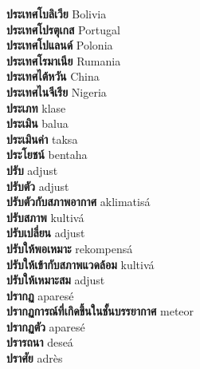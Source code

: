 \textbf{ ประเทศโบลิเวีย  } Bolivia \\
\textbf{ ประเทศโปรตุเกส  } Portugal \\
\textbf{ ประเทศโปแลนด์  } Polonia \\
\textbf{ ประเทศโรมาเนีย  } Rumania \\
\textbf{ ประเทศไต้หวัน  } China \\
\textbf{ ประเทศไนจีเรีย  } Nigeria \\
\textbf{ ประเภท  } klase \\
\textbf{ ประเมิน  } balua \\
\textbf{ ประเมินค่า  } taksa \\
\textbf{ ประโยชน์  } bentaha \\
\textbf{ ปรับ  } adjust \\
\textbf{ ปรับตัว  } adjust \\
\textbf{ ปรับตัวกับสภาพอากาศ  } aklimatisá \\
\textbf{ ปรับสภาพ  } kultivá \\
\textbf{ ปรับเปลี่ยน  } adjust \\
\textbf{ ปรับให้พอเหมาะ  } rekompensá \\
\textbf{ ปรับให้เข้ากับสภาพแวดล้อม  } kultivá \\
\textbf{ ปรับให้เหมาะสม  } adjust \\
\textbf{ ปรากฏ  } aparesé \\
\textbf{ ปรากฏการณ์ที่เกิดขึ้นในชั้นบรรยากาศ  } meteor \\
\textbf{ ปรากฏตัว  } aparesé \\
\textbf{ ปรารถนา  } deseá \\
\textbf{ ปราศัย  } adrès \\

